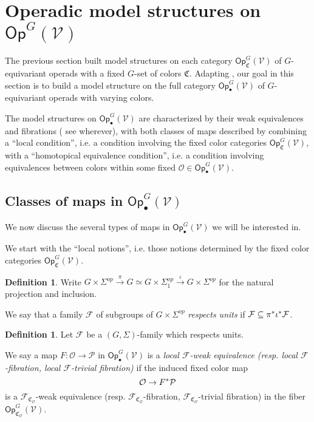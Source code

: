 \documentclass[a4paper,10pt
,draft
]{article}%
\numberwithin{equation}{section}
\numberwithin{figure}{section}
\theoremstyle{definition} %
\newtheorem{definition}[equation]{Definition}%
\newcommand{\F}{\ensuremath{\mathcal F}}
\newcommand{\V}{\ensuremath{\mathcal V}}
\renewcommand{\O}{\ensuremath{\mathcal O}}
\renewcommand{\P}{\ensuremath{\mathcal P}}
\newcommand{\C}{\ensuremath{\mathcal C}}
\newcommand{\1}{\ensuremath{\mathbbm 1}}%
\begin{document}
  







\newpage


\section{Operadic model structures on $\mathsf{Op}^G(\mathcal{V})$}\label{MS_SEC}
\renewcommand{\C}{\mathfrak C}



The previous section built model structures on each category
$\mathsf{Op}_{\mathfrak{C}}^G(\V)$
of $G$-equivariant operads with a fixed $G$-set of colors $\mathfrak{C}$.
Adapting \cite{BM13,Cav,CM13b}, 
our goal in this section is to build a model structure on the full category $\mathsf{Op}^G_\bullet(\mathcal{V})$
of $G$-equivariant operads with varying colors. 

The model structures on $\mathsf{Op}^G_\bullet(\V)$ are characterized by their weak equivalences and fibrations
({\color{red} see wherever}), 
with both classes of maps described by combining a ``local condition'', i.e. a condition involving the fixed color categories $\mathsf{Op}_{\mathfrak{C}}^G(\V)$,
with a ``homotopical equivalence condition'',
i.e. a condition involving equivalences between colors within
some fixed $\O \in \mathsf{Op}^G_\bullet(\V)$.



\subsection{Classes of maps in $\mathsf{Op}^G_\bullet(\V)$}

We now discuss the several types of maps in 
$\mathsf{Op}^G_\bullet(\V)$ we will be interested in.

We start with the ``local notions'', 
i.e. those notions determined by the fixed color categories $\mathsf{Op}_{\mathfrak{C}}^G(\V)$.


\begin{definition}
Write $G \times \Sigma^{op} \xrightarrow{\pi} 
G \simeq G \times \Sigma_1^{op} \xrightarrow{\iota} G \times \Sigma^{op}$
for the natural projection and inclusion.

We say that a family $\F$ of subgroups of $G\times \Sigma^{op}$
\emph{respects units} if $\F \subseteq \pi^{\**} \iota^{\**} \F$.
\end{definition}


\begin{definition}
Let $\F$ be a $(G, \Sigma)$-family which respects units.

We say a map $F: \O \to \P$ in $\mathsf{Op}^G_\bullet(\V)$
is a \emph{local $\F$-weak equivalence (resp. local $\F$-fibration, local $\F$-trivial fibration)}
if the induced fixed color map
\[\O \to F^{\**} \P\]
is a $\F_{\mathfrak{C}_{\O}}$-weak equivalence (resp. $\F_{\mathfrak{C}_{\O}}$-fibration, $\F_{\mathfrak{C}_{\O}}$-trivial fibration) in the fiber $\mathsf{Op}^G_{\mathfrak{C}_{\O}}(\V)$.
\end{definition}
\end{document}
